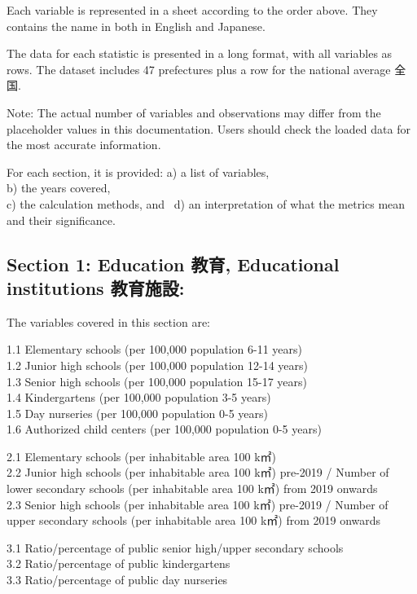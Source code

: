 \documentclass[
  12pt,
  letterpaper,
  DIV=11,
  numbers=noendperiod]{scrartcl}
\begin{document}
Each variable is represented in a sheet according to the order above.
They contains the name in both in English and Japanese.

The data for each statistic is presented in a long format, with all
variables as rows. The dataset includes 47 prefectures plus a row for
the national average 全国.

Note: The actual number of variables and observations may differ from
the placeholder values in this documentation. Users should check the
loaded data for the most accurate information.

For each section, it is provided: a) a list of variables,\\
b) the years covered,\\
c) the calculation methods, and~ d) an interpretation of what the
metrics mean and their significance.

\hypertarget{section-1-education-ux6559ux80b2-educational-institutions-ux6559ux80b2ux65bdux8a2d}{%
\subsection{Section 1: Education 教育, Educational institutions
教育施設:}\label{section-1-education-ux6559ux80b2-educational-institutions-ux6559ux80b2ux65bdux8a2d}}

The variables covered in this section are:

1.1 Elementary schools (per 100,000 population 6-11 years)\\
1.2 Junior high schools (per 100,000 population 12-14 years)\\
1.3 Senior high schools (per 100,000 population 15-17 years)\\
1.4 Kindergartens (per 100,000 population 3-5 years)\\
1.5 Day nurseries (per 100,000 population 0-5 years)\\
1.6 Authorized child centers (per 100,000 population 0-5 years)

2.1 Elementary schools (per inhabitable area 100 k㎡)\\
2.2 Junior high schools (per inhabitable area 100 k㎡) pre-2019 / Number
of lower secondary schools (per inhabitable area 100 k㎡) from 2019
onwards\\
2.3 Senior high schools (per inhabitable area 100 k㎡) pre-2019 / Number
of upper secondary schools (per inhabitable area 100 k㎡) from 2019
onwards

3.1 Ratio/percentage of public senior high/upper secondary schools\\
3.2 Ratio/percentage of public kindergartens\\
3.3 Ratio/percentage of public day nurseries
\end{document}
